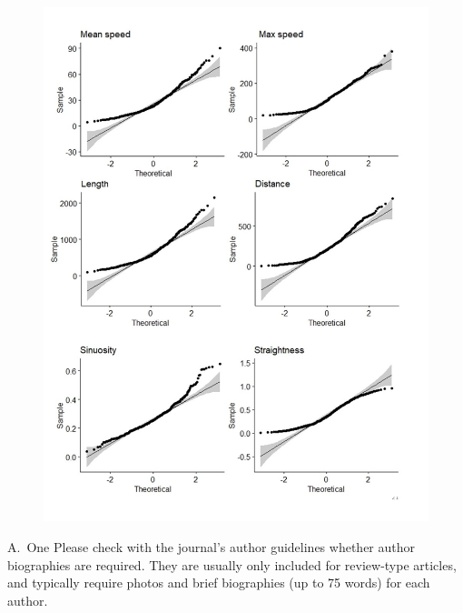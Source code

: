 \documentclass[num-refs]{wiley-article}
\begin{document}
\begin{figure}[hbt!]
  \includegraphics[width=1\linewidth]{qqplot.jpg}
  \caption{}
  \centering
\end{figure}

\printendnotes

% 
\iffalse
\begin{biography}{A.~One}
Please check with the journal's author guidelines whether author biographies are required. They are usually only included for review-type articles, and typically require photos and brief biographies (up to 75 words) for each author.
\bigskip
\bigskip
\end{biography}

\end{document}
